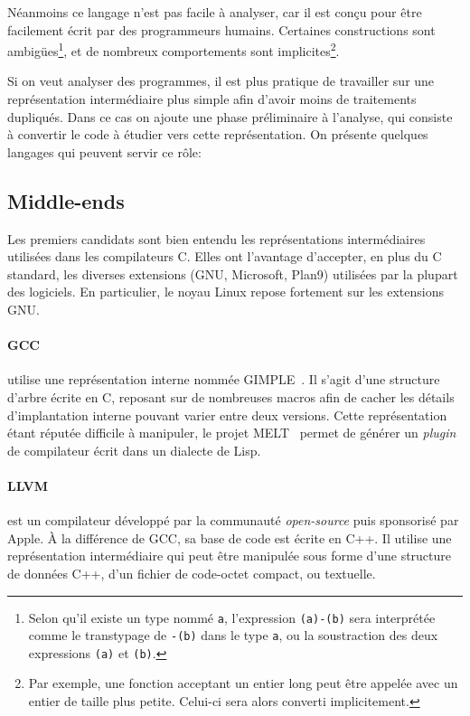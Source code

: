 Néanmoins ce langage n'est pas facile à analyser, car il est conçu pour être
facilement écrit par des programmeurs humains. Certaines constructions sont
ambigües\footnote{
    Selon qu'il existe un type nommé \texttt{a}, l'expression \texttt{(a)-(b)}
    sera interprétée comme le transtypage de \texttt{-(b)} dans le type
    \texttt{a}, ou la soustraction des deux expressions \texttt{(a)} et
    \texttt{(b)}.
}, et de nombreux comportements sont implicites\footnote{
    Par exemple, une fonction acceptant un entier long peut être appelée avec un
    entier de taille plus petite. Celui-ci sera alors converti implicitement.
}.


Si on veut analyser des programmes, il est plus pratique de travailler sur une
représentation intermédiaire plus simple afin d'avoir moins de traitements
dupliqués. Dans ce cas on ajoute une phase préliminaire à l'analyse, qui
consiste à convertir le code à étudier vers cette représentation. On présente
quelques langages qui peuvent servir ce rôle:

\subsection*{Middle-ends}

Les premiers candidats sont bien entendu les représentations intermédiaires
utilisées dans les compilateurs C. Elles ont l'avantage d'accepter, en plus du C
standard, les diverses extensions (GNU, Microsoft, Plan9) utilisées par la
plupart des logiciels. En particulier, le noyau Linux repose fortement sur les
extensions GNU.\@

\paragraph{GCC} utilise une représentation interne nommée
GIMPLE~\cite{gcc-gimple}. Il s'agit d'une structure d'arbre écrite en C,
reposant sur de nombreuses macros afin de cacher les détails d'implantation
interne pouvant varier entre deux versions. Cette représentation étant réputée
difficile à manipuler, le projet MELT~\cite{gcc-melt} permet de générer un
\emph{plugin} de compilateur écrit dans un dialecte de Lisp.

\paragraph{LLVM}\cite{llvm-pres} est un compilateur développé par la communauté
\emph{open-source} puis sponsorisé par Apple. À la différence de GCC, sa base de
code est écrite en C++. Il utilise une représentation intermédiaire qui peut
être manipulée sous forme d'une structure de données C++, d'un fichier de
code-octet compact, ou textuelle.

